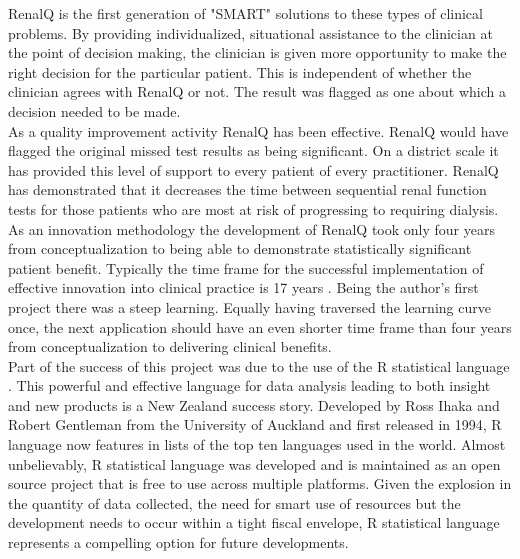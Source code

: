 \documentclass[11pt]{article}
\begin{document}
RenalQ is the first generation of "SMART" solutions to these types of clinical problems. By providing individualized, situational assistance to the clinician at the point of decision making, the clinician is given more opportunity to make the right decision for the particular patient. This is independent of whether the clinician agrees with RenalQ or not. The result was flagged as one about which a decision needed to be made.\\ 

As a quality improvement activity RenalQ has been effective. RenalQ would have flagged the original missed test results as being significant. On a district scale it has provided this level of support to every patient of every practitioner. RenalQ has demonstrated that it decreases the time between sequential renal function tests for those patients who are most at risk of progressing to requiring dialysis. \\

As an innovation methodology the development of RenalQ took only four years from conceptualization to being able to demonstrate statistically significant patient benefit. Typically the time frame for the successful implementation of effective innovation into clinical practice is 17 years \citep{morris2011answer}. Being the author's first project there was a steep learning. Equally having traversed the learning curve once, the next application should have an even shorter time frame than four years from conceptualization to delivering clinical benefits. \\

Part of the success of this project was due to the use of the R statistical language \citep{rstat2013}. This powerful and effective language for data analysis leading to both insight and new products is a New Zealand success story. Developed by Ross Ihaka and Robert Gentleman from the University of Auckland and first released in 1994, R language now features in lists of the top ten languages used in the world. Almost unbelievably, R statistical language was developed and is maintained as an open source project that is free to use across multiple platforms. Given the explosion in the quantity of data collected, the need for smart use of resources but the development needs to occur within a tight fiscal envelope, R statistical language represents a compelling option for future developments. \\





\end{document}
